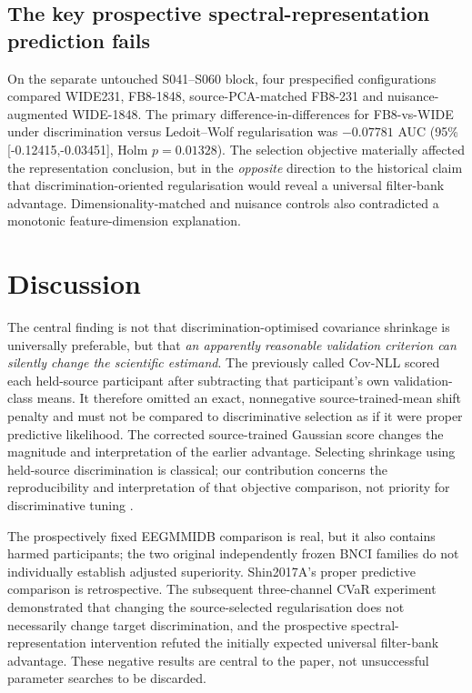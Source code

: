 \documentclass[12pt,a4paper]{article}
\begin{document}





\subsection{The key prospective spectral-representation prediction fails}
On the separate untouched S041--S060 block, four prespecified
configurations compared WIDE231, FB8-1848, source-PCA-matched
FB8-231 and nuisance-augmented WIDE-1848. The primary
difference-in-differences for FB8-vs-WIDE under discrimination versus
Ledoit--Wolf regularisation was \(-0.07781\) AUC
(95\% [-0.12415,-0.03451], Holm \(p=0.01328\)).
The selection objective materially affected the representation
conclusion, but in the \emph{opposite} direction to the historical
claim that discrimination-oriented regularisation would reveal a
universal filter-bank advantage. Dimensionality-matched and nuisance
controls also contradicted a monotonic feature-dimension explanation.

\section{Discussion}
The central finding is not that discrimination-optimised covariance
shrinkage is universally preferable, but that \emph{an apparently
reasonable validation criterion can silently change the scientific
estimand}. The previously called Cov-NLL scored each held-source
participant after subtracting that participant's own validation-class
means. It therefore omitted an exact, nonnegative source-trained-mean
shift penalty and must not be compared to discriminative selection
as if it were proper predictive likelihood. The corrected source-trained
Gaussian score changes the magnitude and interpretation of the earlier
advantage. Selecting shrinkage using held-source discrimination is
classical; our contribution concerns the reproducibility and
interpretation of that objective comparison, not priority for
discriminative tuning \cite{friedman1989,tomioka2010regularized}.

The prospectively fixed EEGMMIDB comparison is real, but it also
contains harmed participants; the two original independently frozen
BNCI families do not individually establish adjusted superiority.
Shin2017A's proper predictive comparison is retrospective.
The subsequent three-channel CVaR experiment demonstrated
that changing the source-selected regularisation does not
necessarily change target discrimination, and the prospective
spectral-representation intervention refuted the initially
expected universal filter-bank advantage. These negative
results are central to the paper, not unsuccessful parameter
searches to be discarded.
\end{document}
